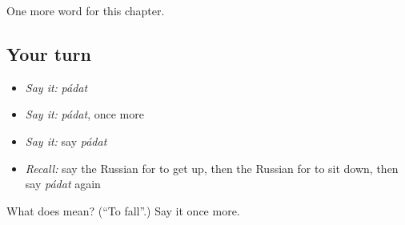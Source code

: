 \begin{grammarlens}[title={What you've built}]
One more word for this chapter.
\end{grammarlens}

\subsection*{Your turn}
\begin{itemize}
\raggedright
  \item \emph{Say it:} \emph{pádat}
  \item \emph{Say it:} \emph{pádat}, once more
  \item \emph{Say it:} say \emph{pádat}
  \item \emph{Recall:} say the Russian for to get up, then the Russian for to sit down, then say \emph{pádat} again
\end{itemize}

\begin{tcolorbox}[breakable,colback=teal!4,colframe=teal!35!black,title={Before you move on}]
What does  mean? (\textquotedblleft{}To fall\textquotedblright{}.) Say it once more.
\end{tcolorbox}
